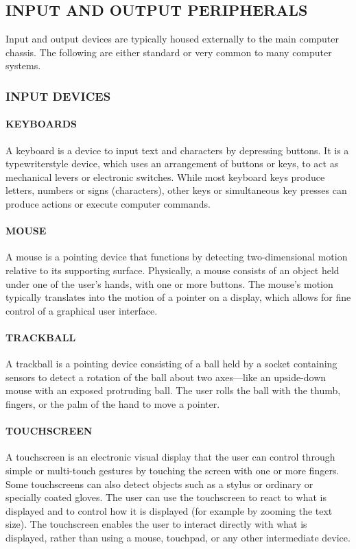 \documentclass[a4paper,28pt]{report}
\begin{document}
\subsection*{INPUT AND OUTPUT PERIPHERALS}
	Input and output devices are typically housed externally to the main computer chassis. The following are either
	standard or very common to many computer systems.
\subsubsection*{INPUT DEVICES}
	\paragraph{KEYBOARDS}
		 A keyboard is a device to input text and characters by depressing buttons. It is a typewriterstyle
	device, which uses an arrangement of buttons or keys, to act as mechanical levers or electronic
	switches. While most keyboard keys produce letters, numbers or signs (characters), other keys or
	simultaneous key presses can produce actions or execute computer commands.
	\paragraph{MOUSE}
	 A mouse is a pointing device that functions by detecting two-dimensional motion relative to its
	supporting surface. Physically, a mouse consists of an object held under one of the user's hands, with
	one or more buttons. The mouse's motion typically translates into the motion of a pointer on a display,
	which allows for fine control of a graphical user interface. 
	\paragraph{TRACKBALL}
	 A trackball is a pointing device consisting of a ball held by a socket containing sensors to
	detect a rotation of the ball about two axes—like an upside-down mouse with an exposed protruding
	ball. The user rolls the ball with the thumb, fingers, or the palm of the hand to move a pointer.
	\paragraph{TOUCHSCREEN}
	 A touchscreen is an electronic visual display that the user can control through simple
	or multi-touch gestures by touching the screen with one or more fingers. Some touchscreens can also
	detect objects such as a stylus or ordinary or specially coated gloves. The user can use the touchscreen
	to react to what is displayed and to control how it is displayed (for example by zooming the text size).
		The touchscreen enables the user to interact directly with what is displayed, rather than using
	a mouse, touchpad, or any other intermediate device. 
\end{document}
